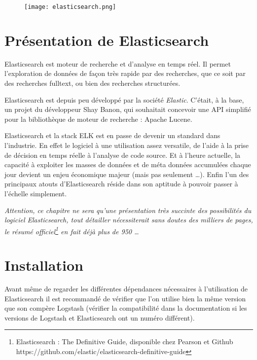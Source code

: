 
\begin{figure}[H]
\center
\texttt{[image: elasticsearch.png]}
\label{fig:elasticsearchlogo.png}
\end{figure}

\section{Présentation de Elasticsearch}
Elasticsearch est moteur de recherche et d'analyse en temps réel. Il permet l'exploration
de données de façon très rapide par des recherches, que ce soit par des recherches
\gls{fulltext}, ou bien des recherches structurées.

Elasticsearch est depuis peu développé par la société \emph{Elastic}. C'était, à 
la base, un projet du développeur Shay Banon, qui souhaitait concevoir une API simplifié
pour la bibliothèque de moteur de recherche : Apache Lucene.

Elasticsearch et la stack ELK est en passe de devenir un standard dans l'industrie.
En effet le logiciel à une utilisation assez versatile, de l'aide à la prise de 
décision en temps réelle à l'analyse de code source. Et à l'heure actuelle, la capacité 
à exploiter les masses de données et de méta données accumulées chaque jour devient 
un enjeu économique majeur (mais pas seulement \ldots). Enfin l'un des principaux 
atouts d'Elasticsearch réside dans son aptitude à pouvoir passer à l'échelle simplement.

\footnotesize{\emph{Attention, ce chapitre ne sera qu'une présentation très succinte des possibilités 
du logiciel Elasticsearch, tout détailler nécessiterait \emph{sans doutes} des milliers
de pages, le résumé officiel\footnote{Elasticsearch : The Definitive Guide, disponible 
chez Pearson et Github https://github.com/elastic/elasticsearch-definitive-guide}
en fait déjà \emph{plus de 950} \ldots}}

\section{Installation}
Avant même de regarder les différentes dépendances nécessaires à l'utilisation de
Elasticsearch il est recommandé de vérifier que l'on utilise bien la même version
que son compère Logstash (vérifier la compatibilité dans la documentation si les
versions de Logstash et Elasticsearch ont un numéro différent).

